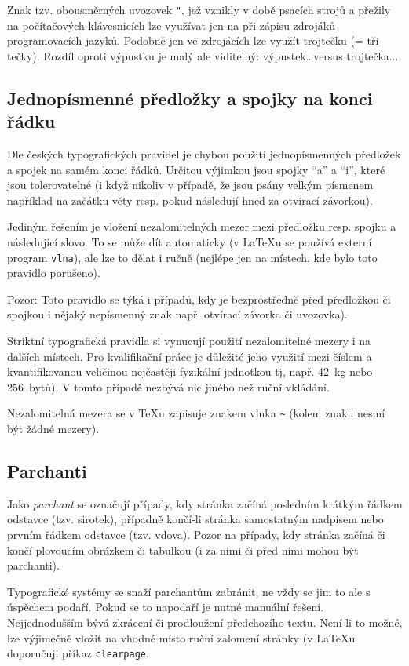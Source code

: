 \documentclass[male,czech,api_bc]{kitheses}
\begin{document}
Znak tzv. obousměrných uvozovek \verb!"!, jež vznikly v době psacích strojů a přežily na počítačových klávesnicích lze využívat jen na při zápisu zdrojáků programovacích jazyků. Podobně jen ve zdrojácích lze využít trojtečku (= tři tečky). Rozdíl oproti výpustku je malý ale viditelný: 
výpustek\ldots versus trojtečka...


\subsection{Jednopísmenné předložky a spojky na konci řádku}

Dle českých typografických pravidel je chybou použití jednopísmenných předložek a spojek na samém konci řádků. 
Určitou výjimkou jsou spojky \enquote{a} a \enquote{i}, které jsou tolerovatelné (i když nikoliv v případě, že jsou psány velkým písmenem například na začátku věty resp. pokud následují hned za otvírací závorkou).

Jediným řešením je vložení nezalomitelných mezer mezi předložku resp. spojku a následující slovo. To se může dít automaticky (v \LaTeX u se používá externí program \texttt{vlna}), ale lze to dělat i ručně (nejlépe jen  na místech, kde bylo toto pravidlo porušeno).

Pozor: Toto pravidlo se týká i případů, kdy je bezprostředně před předložkou či spojkou i nějaký nepísmenný znak např. otvírací závorka či uvozovka).

Striktní typografická pravidla si vynucují použití nezalomitelné mezery i na dalších místech. Pro kvalifikační práce je důležité jeho využití mezi číslem a kvantifikovanou veličinou nejčastěji fyzikální jednotkou tj, např. 42~kg nebo 256~bytů). V tomto případě nezbývá nic jiného než ruční vkládání.

Nezalomitelná mezera se v \TeX{}u zapisuje znakem vlnka \texttt{\textasciitilde} (kolem znaku nesmí být žádné mezery).

\subsection{Parchanti}

Jako \textit{parchant} se označují případy, kdy stránka začíná posledním krátkým řádkem odstavce (tzv. sirotek), případně končí-li stránka samostatným nadpisem nebo prvním řádkem odstavce (tzv. vdova). Pozor na případy, kdy stránka začíná či končí plovoucím obrázkem či tabulkou (i za nimi či před nimi mohou být parchanti).

Typografické systémy se snaží parchantům zabránit, ne vždy se jim to ale s úspěchem podaří. Pokud se to napodaří je nutné manuální řešení. Nejjednodušším bývá zkrácení či prodloužení předchozího textu. Není-li to možné, lze výjimečně vložit na vhodné místo ruční zalomení stránky (v \LaTeX{}u doporučuji příkaz \verb!clearpage!.
\end{document}
